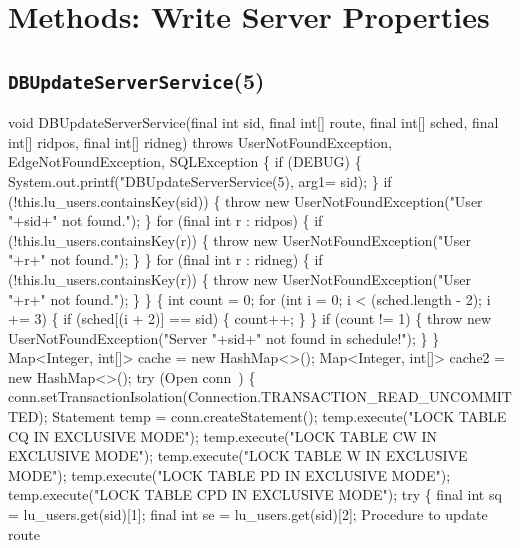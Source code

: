 \section{Methods: Write Server Properties}

\subsection{\texttt{DBUpdateServerService}(5)}
\nwenddocs{}\endmoddef{}
void DBUpdateServerService(final int sid, final int[] route, final int[] sched,
    final int[] ridpos, final int[] ridneg)
throws UserNotFoundException, EdgeNotFoundException, SQLException \{
  if (DEBUG) \{
    System.out.printf("DBUpdateServerService(5), arg1=%
        sid);
  \}
  if (!this.lu_users.containsKey(sid)) \{
    throw new UserNotFoundException("User "+sid+" not found.");
  \}
  for (final int r : ridpos) \{
    if (!this.lu_users.containsKey(r)) \{
      throw new UserNotFoundException("User "+r+" not found.");
    \}
  \}
  for (final int r : ridneg) \{
    if (!this.lu_users.containsKey(r)) \{
      throw new UserNotFoundException("User "+r+" not found.");
    \}
  \}
  \{
    int count = 0;
    for (int i = 0; i < (sched.length - 2); i += 3) \{
      if (sched[(i + 2)] == sid) \{
        count++;
      \}
    \}
    if (count != 1) \{
      throw new UserNotFoundException("Server "+sid+" not found in schedule!");
    \}
  \}
  Map<Integer, int[]> cache  = new HashMap<>();
  Map<Integer, int[]> cache2 = new HashMap<>();
  try (\LA{}Open \code{}conn\edoc{}~{\nwtagstyle{}}\RA{}) \{
    conn.setTransactionIsolation(Connection.TRANSACTION_READ_UNCOMMITTED);
    Statement temp = conn.createStatement();
    temp.execute("LOCK TABLE CQ  IN EXCLUSIVE MODE");
    temp.execute("LOCK TABLE CW  IN EXCLUSIVE MODE");
    temp.execute("LOCK TABLE W   IN EXCLUSIVE MODE");
    temp.execute("LOCK TABLE PD  IN EXCLUSIVE MODE");
    temp.execute("LOCK TABLE CPD IN EXCLUSIVE MODE");
    try \{
      final int sq = lu_users.get(sid)[1];
      final int se = lu_users.get(sid)[2];
      \LA{}Procedure to update route~{\nwtagstyle{}}\RA{}

